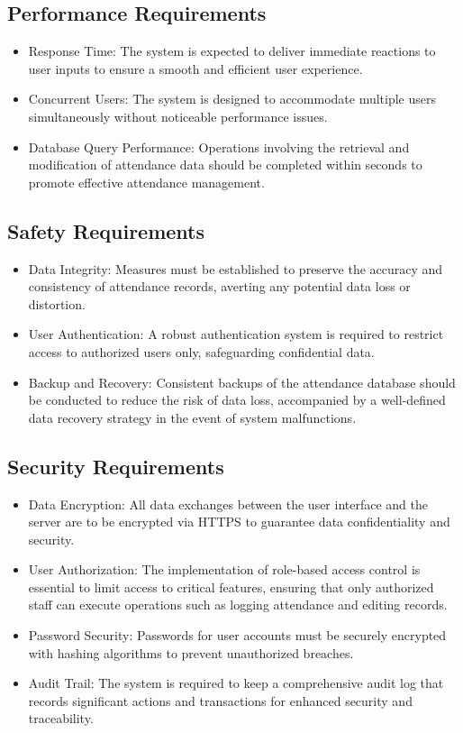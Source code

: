 \documentclass[a4paper, 12pt]{article}
\begin{document}
\subsection{Performance Requirements}
\begin{itemize}
    \item Response Time: The system is expected to deliver immediate reactions to user inputs to ensure a smooth and efficient user experience.
    \item Concurrent Users: The system is designed to accommodate multiple users simultaneously without noticeable performance issues.
    \item Database Query Performance: Operations involving the retrieval and modification of attendance data should be completed within seconds to promote effective attendance management.
\end{itemize}

\subsection{Safety Requirements}
\begin{itemize}
    \item Data Integrity: Measures must be established to preserve the accuracy and consistency of attendance records, averting any potential data loss or distortion.
    \item User Authentication: A robust authentication system is required to restrict access to authorized users only, safeguarding confidential data.
    \item Backup and Recovery: Consistent backups of the attendance database should be conducted to reduce the risk of data loss, accompanied by a well-defined data recovery strategy in the event of system malfunctions.
\end{itemize}

\subsection{Security Requirements}
\begin{itemize}
    \item Data Encryption: All data exchanges between the user interface and the server are to be encrypted via HTTPS to guarantee data confidentiality and security.
    \item User Authorization: The implementation of role-based access control is essential to limit access to critical features, ensuring that only authorized staff can execute operations such as logging attendance and editing records.
    \item Password Security: Passwords for user accounts must be securely encrypted with hashing algorithms to prevent unauthorized breaches.
    \item Audit Trail: The system is required to keep a comprehensive audit log that records significant actions and transactions for enhanced security and traceability.
\end{itemize}
\end{document}
